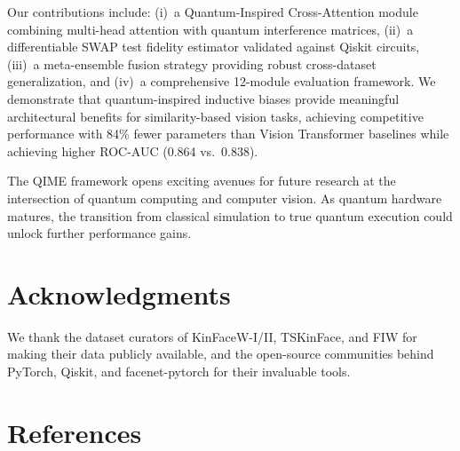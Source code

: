 \documentclass[journal,12pt]{IEEEtran}
\begin{document}
Our contributions include: (i)~a Quantum-Inspired Cross-Attention module
combining multi-head attention with quantum interference matrices,
(ii)~a differentiable SWAP test fidelity estimator validated against
Qiskit circuits, (iii)~a meta-ensemble fusion strategy providing robust
cross-dataset generalization, and (iv)~a comprehensive 12-module
evaluation framework. We demonstrate that quantum-inspired inductive
biases provide meaningful architectural benefits for similarity-based
vision tasks, achieving competitive performance with 84\% fewer
parameters than Vision Transformer baselines while achieving higher
ROC-AUC (0.864 vs.\ 0.838).

The QIME framework opens exciting avenues for future research at the
intersection of quantum computing and computer vision. As quantum hardware
matures, the transition from classical simulation to true quantum
execution could unlock further performance gains.

\section*{Acknowledgments}
We thank the dataset curators of KinFaceW-I/II, TSKinFace, and FIW for
making their data publicly available, and the open-source communities
behind PyTorch, Qiskit, and facenet-pytorch for their invaluable tools.

\section*{References}
\end{document}
